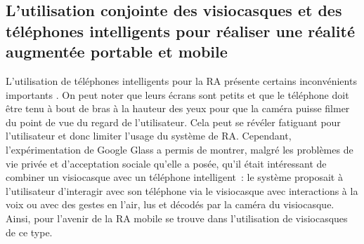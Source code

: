 \subsection*{L'utilisation conjointe des visiocasques et des téléphones intelligents pour réaliser une réalité augmentée portable et mobile}
L'utilisation de téléphones intelligents pour la RA présente  certains inconvénients importants . On peut noter que leurs écrans sont petits et que le téléphone doit être tenu à bout de bras à la hauteur des yeux pour que la caméra puisse filmer du point de vue du regard de l'utilisateur. Cela peut se révéler fatiguant pour l'utilisateur et donc limiter l'usage du système de RA. Cependant, l'expérimentation de Google Glass a permis de montrer, malgré les problèmes de vie privée et d'acceptation sociale qu'elle a posée, qu'il était intéressant de combiner un visiocasque avec un téléphone intelligent~: le système proposait à l'utilisateur d'interagir avec son téléphone via le visiocasque avec interactions à la voix ou avec des gestes en l'air, lus et décodés par la caméra du visiocasque. Ainsi, pour \citet{HuangHuiPeyloEtAl2013} l'avenir de la RA mobile se trouve dans l'utilisation de visiocasques de ce type. 




